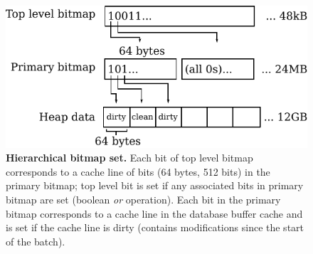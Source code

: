 \begin{figure}
  \centering
  \includegraphics[width=.7\linewidth]{OLTP_design/bitset.pdf}
  \caption{\textbf{Hierarchical bitmap set.} Each bit of top level bitmap corresponds to a cache line of bits (64 bytes, 512 bits) in the primary bitmap; top level bit is set if any associated bits in primary bitmap are set (boolean \emph{or} operation).  Each bit in the primary bitmap corresponds to a cache line in the database buffer cache and is set if the cache line is dirty (contains modifications since the start of the batch).}
  \label{fig::bitset}
\end{figure}
